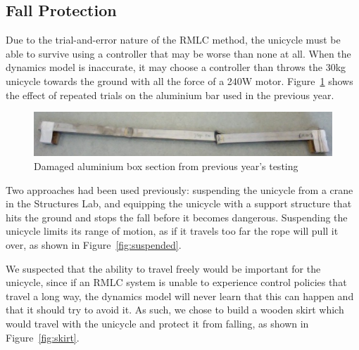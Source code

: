 \documentclass{IIBproject}
\begin{document}
\subsection{Fall Protection}

Due to the trial-and-error nature of the RMLC method, the unicycle must be
able to survive using a controller that may be worse than none at all. When
the dynamics model is inaccurate, it may choose a controller than throws the
30kg unicycle towards the ground with all the force of a 240W motor.
Figure~\ref{fig:alu_bar} shows the effect of repeated trials on the aluminium
bar used in the previous year.

\begin{figure}[htpb]
  \begin{center}
    \includegraphics[width=15cm]{alu_bar.jpg}
    \end{center}
    \caption{Damaged aluminium box section from previous year's testing}
    \label{fig:alu_bar}
    \end{figure}

Two approaches had been used previously: suspending the unicycle from a crane
in the Structures Lab, and equipping the unicycle with a support structure
that hits the ground and stops the fall before it becomes dangerous.
Suspending the unicycle limits its range of motion, as if it travels too far
the rope will pull it over, as shown in Figure~\ref{fig:suspended}.

We suspected that the ability to travel freely would be important for the
unicycle, since if an RMLC system is unable to experience control policies
that travel a long way, the dynamics model will never learn that this can
happen and that it should try to avoid it. As such, we chose to build a wooden
skirt which would travel with the unicycle and protect it from falling, as
shown in Figure~\ref{fig:skirt}.
\end{document}

